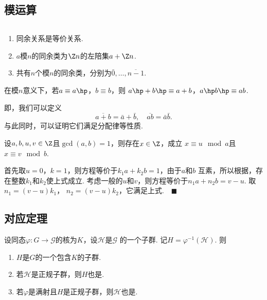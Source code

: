 \subsection{模运算}

  \begin{pos}
    $\,$
    \begin{enumerate}
      \item 同余关系是等价关系.
      \item $a$模$n$的同余类为$\Z n$的左陪集$a+\Z n$.
      \item 共有$n$个模$n$的同余类，分别为$\bar{0},\dots,\overline{n-1}$.
    \end{enumerate}
  \end{pos}

  \begin{thm}
    在模$n$意义下，若$a\equiv a\hp$，$b\equiv b$，则
    $a\hp + b\hp \equiv a + b$，$a\hp b\hp \equiv ab$.
  \end{thm}
  \remark
    即，我们可以定义
    \[
      \overline{a+b} = \bar{a} + \bar{b},\quad
      \overline{ab}  = \bar{a}\bar{b}.
    \]
    与此同时，可以证明它们满足分配律等性质.

  \begin{thm}[中国剩余定理]
    \label{thm: 中国剩余定理}
    设$a,b,u,v\in\Z$且$\gcd(a,b)=1$，则存在$x\in\Z$，成立
    $x\equiv u \mod a$且$x\equiv v\mod b$.
  \end{thm}
  \proof
    首先取$u=0$，$k=1$，则方程等价于$k_1a+k_2b=1$，由于$a$和$b$
    互素，所以根据，存在整数$k_1$和$k_2$使上式成立.
    考虑一般的$u$和$v$，则方程等价于$n_1a+n_2b=v-u$. 取$n_1=(v-u)k_1$，
    $n_2=(v-u)k_2$，它满足上式.$\quad\blacksquare$

\subsection{对应定理}

  \begin{pos}
    \label{pos: 弱对应定理}
    设同态$\varphi:G\to\mathcal{G}$的核为$K$，设$\mathcal{H}$是$\mathcal{G}$
    的一个子群. 记$H=\varphi^{-1}(\mathcal{H})$. 则
    \begin{enumerate}
      \item $H$是$G$的一个包含$K$的子群.
      \item 若$\mathcal{H}$是正规子群，则$H$也是.
      \item 若$\varphi$是满射且$H$是正规子群，则$\mathcal{H}$也是.
    \end{enumerate}
  \end{pos}

